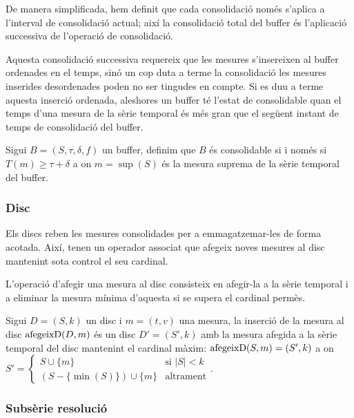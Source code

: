De manera simplificada, hem definit que cada consolidació només
s'aplica a l'interval de consolidació actual; així la consolidació
total del buffer és l'aplicació successiva de l'operació de
consolidació.

Aquesta consolidació successiva requereix que les mesures s'insereixen
al buffer ordenades en el temps, sinó un cop duta a terme la
consolidació les mesures inserides desordenades poden no ser tingudes
en compte. Si es duu a terme aquesta inserció ordenada, aleshores un
buffer té l'estat de consolidable quan el temps d'una mesura de la
sèrie temporal és més gran que el següent instant de temps de
consolidació del buffer.
\begin{definition}\label{def:model:buffer_consolidable}
  Sigui $B=(S,\tau,\delta,f)$ un buffer, definim que $B$ és
  consolidable si i només si $T(m) \geq \tau+\delta$ a on $m=\sup(S)$
  és la mesura suprema de la sèrie temporal del buffer.
\end{definition}



\subsubsection{Disc}

Els discs reben les mesures consolidades per a emmagatzemar-les de
forma acotada. Així, tenen un operador associat que afegeix noves
mesures al disc mantenint sota control el seu cardinal.


L'operació d'afegir una mesura al disc consisteix en afegir-la a la
sèrie temporal i a eliminar la mesura mínima d'aquesta si se supera el
cardinal permès.
\begin{definition}
  Sigui $D=(S,k)$ un disc i $m=(t,v)$ una mesura, la inserció de la
  mesura al disc $\operatorname*{afegeixD}(D,m)$ és un disc $D'=(S',k)$ amb la mesura
  afegida a la sèrie temporal del disc mantenint el cardinal màxim:
  $\operatorname*{afegeixD}(S,m) = (S',k)$ a on $S'=
  \begin{cases}
      S\cup\{m\} &\text{si }  |S|<k\\
      (S-\{\min(S)\}) \cup \{m\} &\text{altrament}
    \end{cases}$.
\end{definition}




\subsubsection{Subsèrie resolució}

